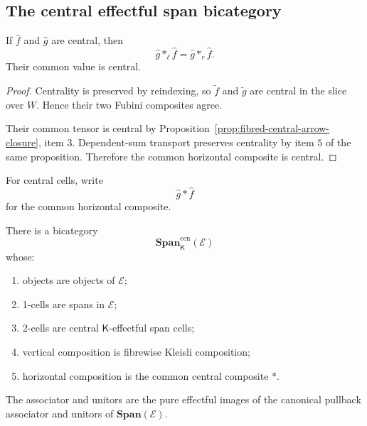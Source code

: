 \subsection{The central effectful span bicategory}
\label{subsec:central-effectful-span-bicategory}

\begin{proposition}
\label{prop:central-horizontal-composition-spans}
If \(\widehat f\) and \(\widehat g\) are central, then
\[
    \widehat g\ast_\ell\widehat f
    =
    \widehat g\ast_r\widehat f.
\]
Their common value is central.
\end{proposition}

\begin{proof}
Centrality is preserved by reindexing, so
\(\widetilde f\) and \(\widetilde g\) are central in the slice over \(W\).
Hence their two Fubini composites agree.

Their common tensor is central by
Proposition~\ref{prop:fibred-central-arrow-closure}, item \(3\).
Dependent-sum transport preserves centrality by item \(5\) of the same
proposition.  Therefore the common horizontal composite is central.
\end{proof}

For central cells, write
\[
    \widehat g\ast\widehat f
\]
for the common horizontal composite.

\begin{theorem}
\label{thm:central-effectful-span-bicategory}
There is a bicategory
\[
    \mathbf{Span}^{\mathrm{cen}}_{\mathsf K}(\mathcal E)
\]
whose:
\begin{enumerate}
    \item objects are objects of \(\mathcal E\);

    \item 1-cells are spans in \(\mathcal E\);

    \item 2-cells are central \(\mathsf K\)-effectful span cells;

    \item vertical composition is fibrewise Kleisli composition;

    \item horizontal composition is the common central composite \(\ast\).
\end{enumerate}
The associator and unitors are the pure effectful images of the canonical
pullback associator and unitors of \(\mathbf{Span}(\mathcal E)\).
\end{theorem}

